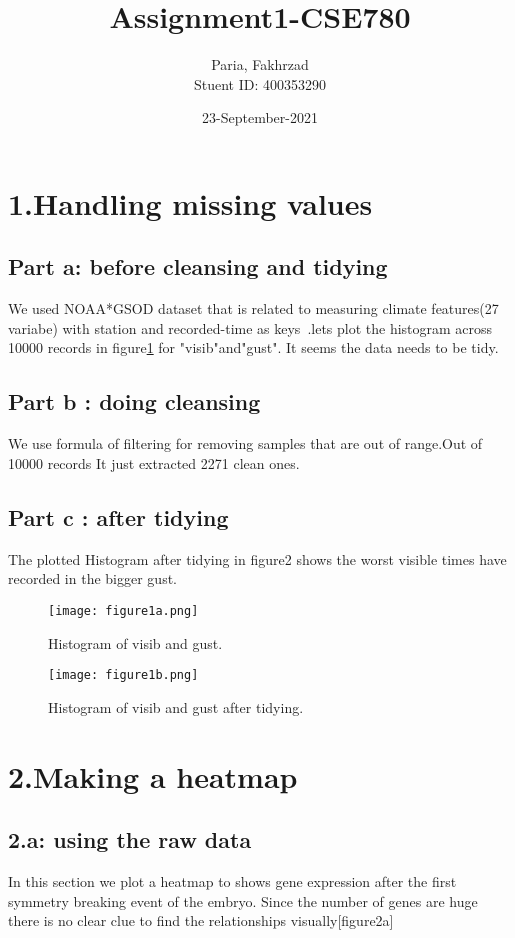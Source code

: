 \documentclass[a4paper, 11pt]{article}
\title{Assignment1-CSE780}
\author{Paria, Fakhrzad \\ Stuent ID: 400353290 }
\date{23-September-2021}
\begin{document}
\maketitle
\newpage
\section*{1.Handling missing values}
\subsection*{Part a:  before cleansing and tidying}
 We used NOAA*GSOD dataset that is related to measuring climate features(27 variabe) with station and recorded-time as keys~\cite{ref}.lets plot the histogram across 10000 records in figure\ref{Figure1a} for "visib"and"gust". It seems the data needs to be tidy.
\subsection*{Part b : doing cleansing}
We use formula of filtering for removing samples that are out of range.Out of 10000 records It just extracted 2271 clean ones.
\subsection*{Part c : after tidying}
The plotted Histogram after tidying in figure2 shows the worst visible times have recorded in the bigger gust.
 \begin{figure}[H]
	\texttt{[image: figure1a.png]}
	\caption{Histogram of visib and gust.}
	\label{Figure1a}
\end{figure}
 \begin{figure}[H]
	\texttt{[image: figure1b.png]}
	\caption{Histogram of visib and gust after tidying.}
	\label{Figure1b}
\end{figure}


\newpage
\section*{2.Making a heatmap}
\subsection*{2.a: using the raw data}
In this section we plot a heatmap to shows gene expression after the ﬁrst symmetry breaking event of the embryo. Since the number of genes are huge there is no clear clue to find the relationships visually[figure2a]
\end{document}
